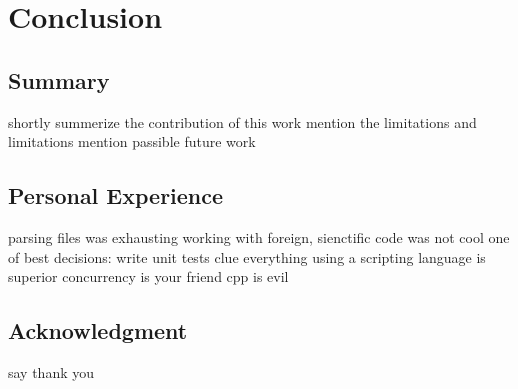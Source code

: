 \chapter{Conclusion}
\section{Summary}
shortly summerize the contribution of this work
mention the limitations and limitations
mention passible future work

\section{Personal Experience}
parsing files was exhausting
working with foreign, sienctific code was not cool
one of best decisions: write unit tests
clue everything using a scripting language is superior
concurrency is your friend
cpp is evil

\section{Acknowledgment}
say thank you
